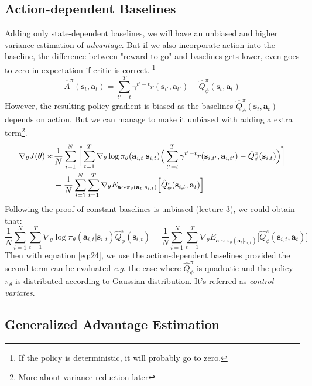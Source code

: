 \documentclass{tufte-handout}
\newcommand{\eg}{\textit{e}.\textit{g}. }
\newcommand{\s}{\mathbf{s}}
\newcommand{\act}{\mathbf{a}}
\begin{document}
\subsection{Action-dependent Baselines}
Adding only state-dependent baselines, we will have an unbiased and higher variance estimation of \emph{advantage}. But if we also incorporate action into the baseline, the difference between "reward to go" and baselines gets lower, even goes to zero in expectation if critic is correct. \thanks{If the policy is deterministic, it will probably go to zero.}
\begin{equation}
\label{eq:23}
\hat{A}^\pi (\s_t, \act_t) = \sum_{t'=t}^T \gamma ^ {t' - t} r(\s_{ t'}, \act_{t'}) - \hat{Q}_\phi ^ \pi (\s_{t}, \act_t)
\end{equation}
However, the resulting policy gradient is biased as the baselines $\hat{Q}_\phi ^ \pi (\s_{t}, \act_t)$ depends on action. But we can manage to make it unbiased with adding a extra term\thanks{More about variance reduction later}.
\begin{align}
\label{eq:24}
\nabla _\theta J(\theta) \approx & \frac{1}{N} \sum_{i=1} ^ {N} \bigg[\sum_{t=1}^T \nabla_\theta \log \pi_\theta(\act_{i,t}| \s_{i,t})
\Big( \sum_{t'=t}^T \gamma ^ {t' - t} r(\s_{i, t'}, \act_{i, t'}) - \hat{Q}_\phi ^ \pi (\s_{i,t}) \Big) \bigg] \notag \\
& + \frac{1}{N} \sum_{i=1} ^ {N} \sum_{t=1}^T \nabla_\theta E_{\act \sim \pi_\theta (\act_t | s_{i,t})} \Big[\hat{Q}_\phi ^ \pi (\s_{i,t}, \act_t) \Big]
\end{align}
Following the proof of constant baselines is unbiased (lecture 3), we could obtain that:
\begin{equation}
\label{eq:25}
\frac{1}{N} \sum_{i=1} ^ {N} \sum_{t=1}^T \nabla_\theta \log \pi_\theta(\act_{i,t}| \s_{i,t})
\hat{Q}_\phi ^ \pi (\s_{i,t}) =
\frac{1}{N} \sum_{i=1} ^ {N} \sum_{t=1}^T \nabla_\theta E_{\act \sim \pi_\theta (\act_t | s_{i,t})} \Big[\hat{Q}_\phi ^ \pi (\s_{i,t}, \act_t) \Big]
\end{equation}
Then with equation \ref{eq:24}, we use the action-dependent baselines provided the second term can be evaluated \eg the case where
 $\hat{Q}_\phi ^ \pi$ is quadratic and the policy $\pi_\theta$ is distributed according to Gaussian distribution. It's referred as \emph{control variates}.

\subsection{Generalized Advantage Estimation}
\end{document}
